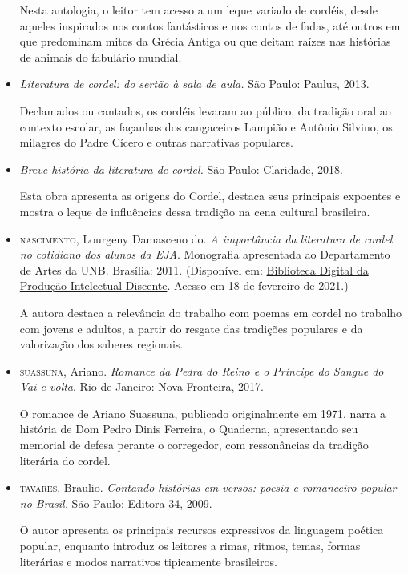 \documentclass[12pt]{extarticle}
\begin{document}
\begin{itemize}
Nesta antologia, o leitor tem acesso a um leque variado de cordéis,
desde aqueles inspirados nos contos fantásticos e nos contos de fadas,
até outros em que predominam mitos da Grécia Antiga ou que deitam raízes
nas histórias de animais do fabulário mundial.

\item {} \textit{Literatura de cordel: do sertão à sala de
aula.} São Paulo: Paulus, 2013.

Declamados ou cantados, os cordéis levaram ao público, da tradição oral
ao contexto escolar, as façanhas dos cangaceiros Lampião e Antônio
Silvino, os milagres do Padre Cícero e outras narrativas populares.

\item {} \textit{Breve história da literatura de cordel.} São
Paulo: Claridade, 2018.

Esta obra apresenta as origens do Cordel, destaca seus principais
expoentes e mostra o leque de influências dessa tradição na cena
cultural brasileira.

\item \textsc{nascimento}, Lourgeny Damasceno do. \textit{A importância da literatura
de cordel no cotidiano dos alunos da EJA}. Monografia apresentada ao
Departamento de Artes da UNB. Brasília: 2011. (Disponível em:
\href{https://bdm.unb.br/bitstream/10483/4463/1/2011_LourgenyDamascenodoNascimento.pdf}{Biblioteca Digital da Produção Intelectual Discente}.
Acesso em 18 de fevereiro de 2021.)

A autora destaca a relevância do trabalho com poemas em cordel no
trabalho com jovens e adultos, a partir do resgate das tradições
populares e da valorização dos saberes regionais.

\item \textsc{suassuna}, Ariano. \textit{Romance da Pedra do Reino e o Príncipe do
Sangue do Vai-e-volta}. Rio de Janeiro: Nova Fronteira, 2017.

O romance de Ariano Suassuna, publicado originalmente em 1971, narra a
história de Dom Pedro Dinis Ferreira, o Quaderna, apresentando seu
memorial de defesa perante o corregedor, com ressonâncias da tradição
literária do cordel.

\item \textsc{tavares}, Braulio. \textit{Contando histórias em versos: poesia e
romanceiro popular no Brasil.} São Paulo: Editora 34, 2009.

O autor apresenta os principais recursos expressivos da linguagem
poética popular, enquanto introduz os leitores a rimas, ritmos, temas,
formas literárias e modos narrativos tipicamente brasileiros.


\end{itemize}
\end{document}
